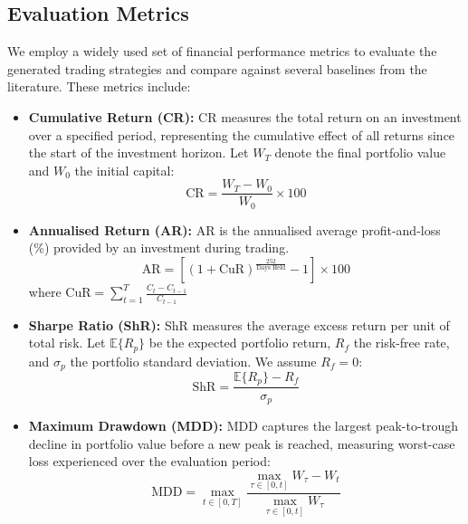 \documentclass[conference]{IEEEtran}
\begin{document}
\subsection{Evaluation Metrics}
We employ a widely used set of financial performance metrics to evaluate the generated trading
strategies and compare against several baselines from the literature.
These metrics include:

\begin{itemize}
  \item \textbf{Cumulative Return (CR):} CR measures the total return on an investment over a
  specified period, representing the cumulative effect of all returns since the start of the
  investment horizon. Let $W_T$ denote the final portfolio value and $W_0$ the initial capital:
  \begin{equation}
    \text{CR} = \frac{W_T - W_0}{W_0} \times 100
  \end{equation}

  \item \textbf{Annualised Return (AR):} AR is the annualised average profit-and-loss (\%)
  provided by an investment during trading.
  \begin{equation}
    \text{AR} = \left[\left(1 + \text{CuR}\right)^{\frac{252}{\text{Days Held}}} - 1\right] \times 100
  \end{equation} where $\text{CuR} = \sum_{t=1}^{T} \frac{C_t - C_{t-1}}{C_{t-1}}$

  \item \textbf{Sharpe Ratio (ShR):} ShR measures the average excess return per unit of total
  risk. Let $\mathbb{E}\{R_p\}$ be the expected portfolio return, $R_f$ the risk-free rate, and
  $\sigma_p$ the portfolio standard deviation. We assume $R_f = 0$:
  \begin{equation}
    \text{ShR} = \frac{\mathbb{E}\{R_p\} - R_f}{\sigma_p}
  \end{equation}

  \item \textbf{Maximum Drawdown (MDD):} MDD captures the largest peak-to-trough decline in
  portfolio value before a new peak is reached, measuring worst-case loss experienced over the
  evaluation period:
  \begin{equation}
    \text{MDD} = \max_{t \in [0,T]} \frac{\displaystyle\max_{\tau \in [0,t]} W_\tau - W_t}{\displaystyle\max_{\tau \in [0,t]} W_\tau}
  \end{equation}
\end{itemize}
\end{document}
